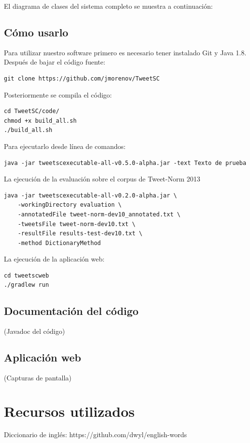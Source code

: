 \documentclass[spanish,12pt, a4paper,twoside]{paper}
\let\oldsection\section
\def\section{\cleardoublepage\oldsection}
\begin{document}
El diagrama de clases del sistema completo se muestra a continuación:

\subsection{Cómo usarlo}\label{sec:comousarlo}
Para utilizar nuestro software primero es necesario tener instalado Git y Java 1.8. Después de bajar el código fuente: 
\begin{verbatim}
git clone https://github.com/jmorenov/TweetSC
\end{verbatim}
Posteriormente se compila el código: 
\begin{verbatim}
cd TweetSC/code/
chmod +x build_all.sh
./build_all.sh
\end{verbatim}
Para ejecutarlo desde línea de comandos:
\begin{verbatim}
java -jar tweetscexecutable-all-v0.5.0-alpha.jar -text Texto de prueba
\end{verbatim}
La ejecución de la evaluación sobre el corpus de Tweet-Norm 2013 \cite{alegria:2013}
\begin{verbatim}
java -jar tweetscexecutable-all-v0.2.0-alpha.jar \
    -workingDirectory evaluation \
    -annotatedFile tweet-norm-dev10_annotated.txt \
    -tweetsFile tweet-norm-dev10.txt \
    -resultFile results-test-dev10.txt \
    -method DictionaryMethod
\end{verbatim}
La ejecución de la aplicación web:
\begin{verbatim}
cd tweetscweb
./gradlew run
\end{verbatim}

\subsection{Documentación del código}\label{sec:javadoc}
(Javadoc del código)

\subsection{Aplicación web}\label{sec:aplicacionweb}
(Capturas de pantalla)

\section{Recursos utilizados}\label{sec:recursosutilizados}


Diccionario de inglés: https://github.com/dwyl/english-words
\end{document}

